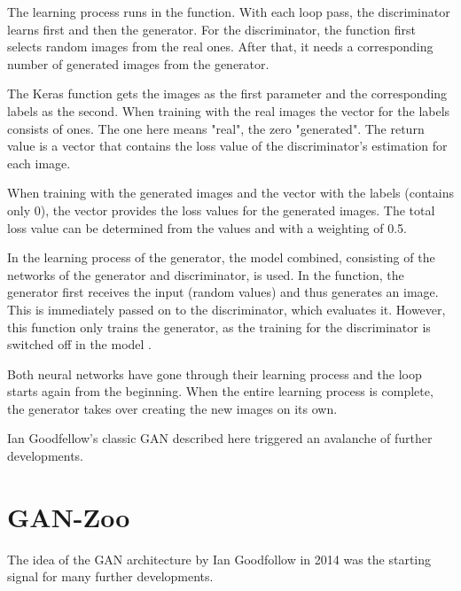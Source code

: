 The learning process runs in the  function. With each loop pass, the discriminator learns first and then the generator. For the discriminator, the  function first selects random images from the real ones. After that, it needs a corresponding number of generated images from the generator.

The Keras function  gets the images as the first parameter and the corresponding labels as the second. When training with the real images  the vector  for the labels consists of ones. The one here means "real", the zero "generated". The return value  is a vector that contains the loss value of the discriminator's estimation for each image.

When training with the generated images  and the vector  with the labels (contains only 0), the vector  provides the loss values for the generated images. The total loss value can be determined from the values  and  with a weighting of 0.5.

In the learning process of the generator, the model combined, consisting of the networks of the generator and discriminator, is used. In the  function, the generator first receives the input  (random values) and thus generates an image. This is immediately passed on to the discriminator, which evaluates it. However, this function only trains the generator, as the training for the discriminator is switched off in the model .

Both neural networks have gone through their learning process and the loop starts again from the beginning. When the entire learning process is complete, the generator takes over creating the new images on its own.

Ian Goodfellow's classic GAN described here triggered an avalanche of further developments.

\section{GAN-Zoo}

The idea of the GAN architecture by Ian Goodfollow in 2014 was the starting signal for many further developments.

